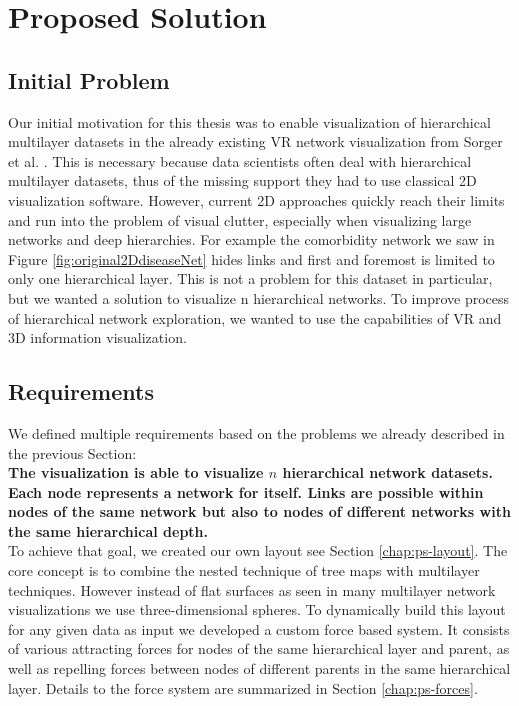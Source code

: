 \chapter{Proposed Solution}

\section{Initial Problem}

Our initial motivation for this thesis was to enable visualization of hierarchical multilayer datasets in the already existing VR network visualization from Sorger et al. \cite{sorger_immersive_2019}. This is necessary because data scientists often deal with hierarchical multilayer datasets, thus of the missing support they had to use classical 2D visualization software. 
However, current 2D approaches quickly reach their limits and run into the problem of visual clutter, especially when visualizing large networks and deep hierarchies. For example the comorbidity network we saw in Figure \ref{fig:original2DdiseaseNet} hides links and first and foremost is limited to only one hierarchical layer. This is not a problem for this dataset in particular, but we wanted a solution to visualize n hierarchical networks.
To improve process of hierarchical network exploration, we wanted to use the capabilities of VR and 3D information visualization. 

\section{Requirements}

We defined multiple requirements based on the problems we already described in the previous Section:\\
\textbf{The visualization is able to visualize $n$ hierarchical network datasets. Each node represents a network for itself. Links are possible within nodes of the same network but also to nodes of different networks with the same hierarchical depth.}\\
To achieve that goal, we created our own layout see Section \ref{chap:ps-layout}. The core concept is to combine the nested technique of tree maps with multilayer techniques. However instead of flat surfaces as seen in many multilayer network visualizations we use three-dimensional spheres. To dynamically build this layout for any given data as input we developed a custom force based system. It consists of various attracting forces for nodes of the same hierarchical layer and parent, as well as repelling forces between nodes of different parents in the same hierarchical layer. Details to the force system are summarized in Section \ref{chap:ps-forces}.

